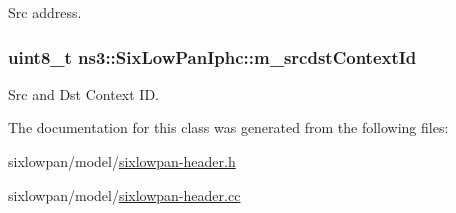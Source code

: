 Src address. 

\subsubsection[{\texorpdfstring{m\+\_\+srcdst\+Context\+Id}{m_srcdstContextId}}]{\setlength{\rightskip}{0pt plus 5cm}uint8\+\_\+t ns3\+::\+Six\+Low\+Pan\+Iphc\+::m\+\_\+srcdst\+Context\+Id\hspace{0.3cm}{\ttfamily [private]}}\hypertarget{classns3_1_1SixLowPanIphc_a2ac21694d4204b8c057cad088281c4dd}{}\label{classns3_1_1SixLowPanIphc_a2ac21694d4204b8c057cad088281c4dd}


Src and Dst Context ID. 



The documentation for this class was generated from the following files\+:\begin{DoxyCompactItemize}
\item 
sixlowpan/model/\hyperlink{sixlowpan-header_8h}{sixlowpan-\/header.\+h}\item 
sixlowpan/model/\hyperlink{sixlowpan-header_8cc}{sixlowpan-\/header.\+cc}\end{DoxyCompactItemize}
